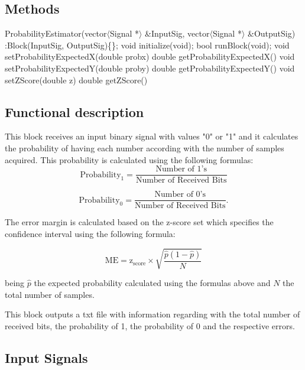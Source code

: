 \subsection*{Methods}

ProbabilityEstimator(vector$\langle$Signal *$\rangle$ \&InputSig, vector$\langle$Signal *$\rangle$ \&OutputSig) :Block(InputSig, OutputSig)\{\};
\bigbreak	
void initialize(void);
\bigbreak	
bool runBlock(void);
\bigbreak	
void setProbabilityExpectedX(double probx)
double getProbabilityExpectedX()
\bigbreak	
void setProbabilityExpectedY(double proby)
double getProbabilityExpectedY()
\bigbreak
void setZScore(double z)
double getZScore()


\subsection*{Functional description}

This block receives an input binary signal with values "0" \space or "1" \space and it calculates the probability of having each number according with the number of samples acquired. This probability is calculated using the following formulas:
\begin{equation}\label{eq:prob1}
  \textrm{Probability}_{1}=\frac{\textrm{Number of 1's}}{\textrm{Number of Received Bits}}
\end{equation}

\begin{equation}\label{eq:prob0}
  \textrm{Probability}_{0}=\frac{\textrm{Number of 0's}}{\textrm{Number of Received Bits}}.
\end{equation}

The error margin is calculated based on the z-score set which specifies the confidence interval using the following formula:

\begin{equation}\label{eq:marginerror}
  \textrm{ME} = \textrm{z}_{\textrm{score}}\times \sqrt{\frac{\hat{p}(1-\hat{p})}{N}}
\end{equation}

being $\hat{p}$ the expected probability calculated using the formulas above and $N$ the total number of samples.

This block outputs a txt file with information regarding with the total number of received bits, the probability of 1, the probability of 0 and the respective errors.

\subsection*{Input Signals}



